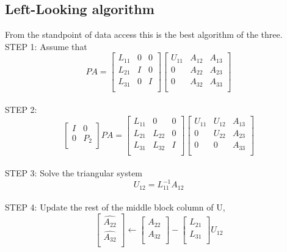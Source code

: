 \subsection{Left-Looking algorithm}
From the standpoint of data access this is the best algorithm of the three.\\
STEP 1: Assume that
\begin{equation}
PA=
\left[\begin{array}{lll}
L_{11} & 0 & 0\\
L_{21} & I & 0\\
L_{31} & 0 & I\\
\end{array}\right]
\left[\begin{array}{lll}
U_{11} & A_{12} & A_{13}\\
0 & A_{22} & A_{23}\\
0 & A_{32} & A_{33}\\
\end{array}\right]
\end{equation}\\
STEP 2:
\begin{equation}
\left[\begin{array}{ll}
 I  & 0 \\
 0  & P_{2}\\   
\end{array}\right] PA=
\left[\begin{array}{lll}
L_{11} & 0 & 0\\
L_{21} & L_{22} & 0\\
L_{31} & L_{32} & I\\
\end{array}\right]
\left[\begin{array}{lll}
U_{11} & U_{12} & A_{13}\\
0 & U_{22} & A_{23}\\   
0 & 0 & A_{33}\\
\end{array}\right]
\end{equation}\\
STEP 3: Solve the triangular system
\begin{equation}
U_{12} = L_{11}^{-1}A_{12}
\end{equation}\\
STEP 4: Update the rest of the middle block column of U,
\begin{equation}
\left[\begin{array}{l}
\hat{A_{22}} \\
\hat{A_{32}} \\
\end{array}\right] \leftarrow
\left[\begin{array}{l}
A_{22} \\
A_{32}\\
\end{array}\right] - 
\left[\begin{array}{l}
L_{21}\\
L_{31}\\
\end{array}\right]U_{12}
\end{equation}\\
